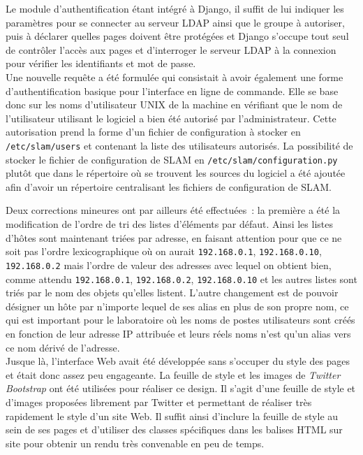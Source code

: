 \documentclass[12pt,a4paper,twoside]{report}
\begin{document}
Le module d’authentification étant intégré à Django, il suffit de lui indiquer
les paramètres pour se connecter au serveur LDAP ainsi que le groupe à
autoriser, puis à déclarer quelles pages doivent être protégées et Django
s’occupe tout seul de contrôler l’accès aux pages et d’interroger le serveur
LDAP à la connexion pour vérifier les identifiants et mot de passe.\\

Une nouvelle requête a été formulée qui consistait à avoir également une forme
d’authentification basique pour l’interface en ligne de commande. Elle se base
donc sur les noms d’utilisateur UNIX de la machine en vérifiant que le nom de
l’utilisateur utilisant le logiciel a bien été autorisé par l’administrateur.
Cette autorisation prend la forme d’un fichier de configuration à stocker en
\verb+/etc/slam/users+ et contenant la liste des utilisateurs autorisés. La
possibilité de stocker le fichier de configuration de SLAM en
\verb+/etc/slam/configuration.py+ plutôt que dans le répertoire où se trouvent
les sources du logiciel a été ajoutée afin d’avoir un répertoire centralisant
les fichiers de configuration de SLAM.

Deux corrections mineures ont par ailleurs été effectuées~: la première a été
la modification de l’ordre de tri des listes d’éléments par défaut. Ainsi les
listes d’hôtes sont maintenant triées par adresse, en faisant attention pour
que ce ne soit pas l’ordre lexicographique où on aurait \verb+192.168.0.1+,
\verb+192.168.0.10+, \verb+192.168.0.2+ mais l’ordre de valeur des adresses
avec lequel on obtient bien, comme attendu \verb+192.168.0.1+,
\verb+192.168.0.2+, \verb+192.168.0.10+ et les autres listes sont triés par le
nom des objets qu’elles listent. L’autre changement est de pouvoir désigner un
hôte par n’importe lequel de ses alias en plus de son propre nom, ce qui est
important pour le laboratoire où les noms de postes utilisateurs sont créés en
fonction de leur adresse IP attribuée et leurs réels noms n’est qu’un alias
vers ce nom dérivé de l’adresse.\\

Jusque là, l’interface Web avait été développée sans s’occuper du style des
pages et était donc assez peu engageante. La feuille de style et les images de
\emph{Twitter Bootstrap} ont été utilisées pour réaliser ce design. Il s’agit
d’une feuille de style et d’images proposées librement par Twitter et
permettant de réaliser très rapidement le style d’un site Web. Il suffit ainsi
d’inclure la feuille de style au sein de ses pages et d’utiliser des classes
spécifiques dans les balises HTML sur site pour obtenir un rendu très
convenable en peu de temps.
\end{document}
